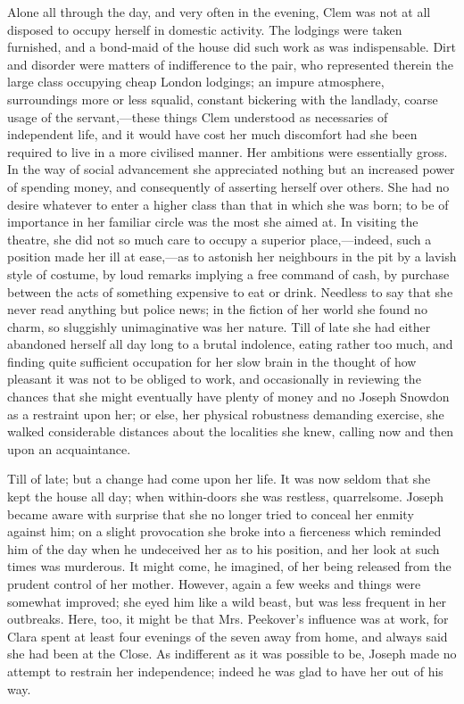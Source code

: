 Alone all through the day, and very often in the evening, Clem was not
at all disposed to occupy herself in domestic activity. The lodgings
were taken furnished, and a bond-maid of the house did such work as was
indispensable. Dirt and disorder were matters of indifference to the
pair, who represented therein the large class occupying cheap
{\protect\hypertarget{28}{}{}}London lodgings; an impure atmosphere,
surroundings more or less squalid, constant bickering with the landlady,
coarse usage of the servant,---these things Clem understood as
necessaries of independent life, and it would have cost her much
discomfort had she been required to live in a more civilised manner. Her
ambitions were essentially gross. In the way of social advancement she
appreciated nothing but an increased power of spending money, and
consequently of asserting herself over others. She had no desire
whatever to enter a higher class than that in which she was born; to be
of importance in her familiar circle was the most she aimed at. In
visiting the theatre, she did not so much care to occupy a superior
place,---indeed, such a position made her ill at ease,---as to astonish
her neighbours in the pit by a lavish style of costume, by loud remarks
implying a free command of cash, by purchase between the acts of
something expensive to eat or drink. Needless to say that she never read
anything but police news; in the fiction of her world she found no
charm, so sluggishly unimaginative was her nature. Till of late she had
{\protect\hypertarget{29}{}{}}either abandoned herself all day long to a
brutal indolence, eating rather too much, and finding quite sufficient
occupation for her slow brain in the thought of how pleasant it was not
to be obliged to work, and occasionally in reviewing the chances that
she might eventually have plenty of money and no Joseph Snowdon as a
restraint upon her; or else, her physical robustness demanding exercise,
she walked considerable distances about the localities she knew, calling
now and then upon an acquaintance.

Till of late; but a change had come upon her life. It was now seldom
that she kept the house all day; when within-doors she was restless,
quarrelsome. Joseph became aware with surprise that she no longer tried
to conceal her enmity against him; on a slight provocation she broke
into a fierceness which reminded him of the day when he undeceived her
as to his position, and her look at such times was murderous. It might
come, he imagined, of her being released from the prudent control of her
mother. However, again a few weeks and things were somewhat improved;
she eyed him like a wild beast, but {\protect\hypertarget{30}{}{}}was
less frequent in her outbreaks. Here, too, it might be that Mrs.
Peekover's influence was at work, for Clara spent at least four evenings
of the seven away from home, and always said she had been at the Close.
As indifferent as it was possible to be, Joseph made no attempt to
restrain her independence; indeed he was glad to have her out of his
way.

